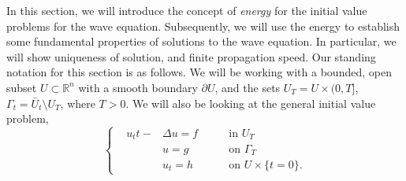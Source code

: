 \documentclass{article}
\numberwithin{equation}{section}
\begin{document}
	In this section, we will introduce the concept of \textit{energy} for the initial value problems for the wave equation. Subsequently, we will use the energy to establish some fundamental properties of solutions to the wave equation. In particular, we will show uniqueness of solution, and finite propagation speed. Our standing notation for this section is as follows. We will be working with a bounded, open subset $U \subset \mathbb{R}^n$ with a smooth boundary $\partial U$, and the sets $U_{T} = U \times (0,T]$, $\Gamma_t = \bar{U}_t \setminus U_{T}$, where $T > 0$. We will also be looking at the general initial value problem, 
	\begin{equation}
		\left\{
		\begin{alignedat}{3}
			&u_tt - &\Delta u = f \qquad &\text{in $U_T$} \\
			&\quad &u = g \qquad &\text{on $\Gamma_T$} \\
			&\quad &u_t = h \qquad &\text{on $U \times \{t = 0\}$}. 
		\end{alignedat}
		\right. 
		\label{eq:gen_wave_eqn}
	\end{equation} 
	
\end{document}
